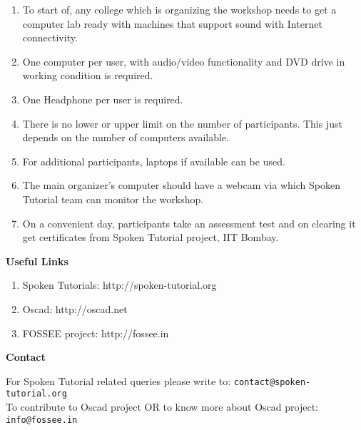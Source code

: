 \begin{enumerate}
\item To start of, any college which is organizing the workshop needs to get a computer lab ready with machines that support sound with Internet  connectivity.
\item One computer per user, with audio/video functionality and DVD drive in working condition is required.
\item One Headphone per user is required.
\item There is no lower or upper limit on the number of participants. This just depends on the number of computers available.
\item For additional participants, laptops if available can be used.
\item The main organizer's computer should have a webcam via which Spoken Tutorial team can monitor the workshop.
\item On a convenient day, participants take an assessment test and on clearing it get certificates from Spoken Tutorial project, IIT Bombay.
\end{enumerate}


\textbf{Useful Links}
\begin{enumerate}
\item Spoken Tutorials: http://spoken-tutorial.org
\item Oscad: http://oscad.net
\item FOSSEE project: http://fossee.in
\end{enumerate}

\textbf{Contact}

For Spoken Tutorial related queries please write to: {\tt contact@spoken-tutorial.org}\\
To contribute to Oscad project OR to know more about Oscad project: {\tt info@fossee.in}
